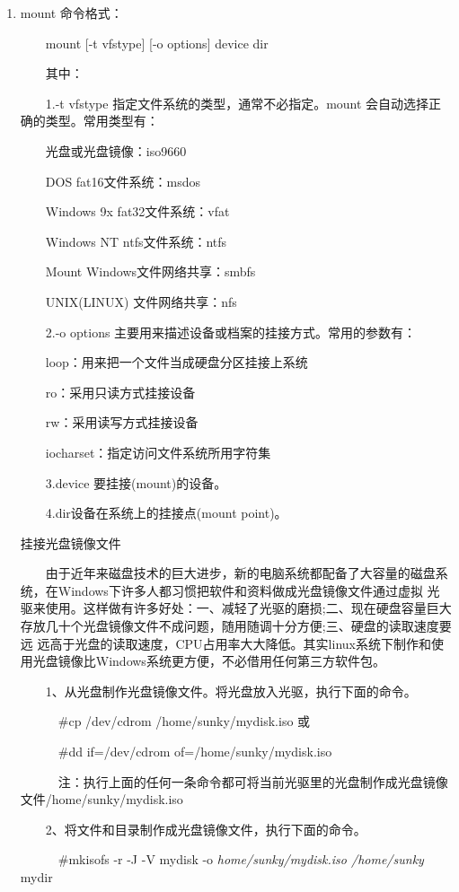 \documentclass[11pt]{article}
\begin{document}
\begin{enumerate}
\item mount
\label{sec-1-1-6-1}
命令格式：

　　mount [-t vfstype] [-o options] device dir

　　其中：

　　1.-t vfstype 指定文件系统的类型，通常不必指定。mount 会自动选择正确的类型。常用类型有：

　　光盘或光盘镜像：iso9660

　　DOS fat16文件系统：msdos

　　Windows 9x fat32文件系统：vfat

　　Windows NT ntfs文件系统：ntfs

　　Mount Windows文件网络共享：smbfs

　　UNIX(LINUX) 文件网络共享：nfs

　　2.-o options 主要用来描述设备或档案的挂接方式。常用的参数有：

　　loop：用来把一个文件当成硬盘分区挂接上系统

　　ro：采用只读方式挂接设备

　　rw：采用读写方式挂接设备

　　iocharset：指定访问文件系统所用字符集

　　3.device 要挂接(mount)的设备。

　　4.dir设备在系统上的挂接点(mount point)。

挂接光盘镜像文件

　　由于近年来磁盘技术的巨大进步，新的电脑系统都配备了大容量的磁盘系统，在Windows下许多人都习惯把软件和资料做成光盘镜像文件通过虚拟 光驱来使用。这样做有许多好处：一、减轻了光驱的磨损;二、现在硬盘容量巨大存放几十个光盘镜像文件不成问题，随用随调十分方便;三、硬盘的读取速度要远 远高于光盘的读取速度，CPU占用率大大降低。其实linux系统下制作和使用光盘镜像比Windows系统更方便，不必借用任何第三方软件包。

　　1、从光盘制作光盘镜像文件。将光盘放入光驱，执行下面的命令。

　　　\#cp /dev/cdrom /home/sunky/mydisk.iso 或

　　　\#dd if=/dev/cdrom of=/home/sunky/mydisk.iso

　　　注：执行上面的任何一条命令都可将当前光驱里的光盘制作成光盘镜像文件/home/sunky/mydisk.iso

　　2、将文件和目录制作成光盘镜像文件，执行下面的命令。

　　　\#mkisofs -r -J -V mydisk -o \emph{home/sunky/mydisk.iso /home/sunky} mydir


\end{enumerate}
\end{document}
